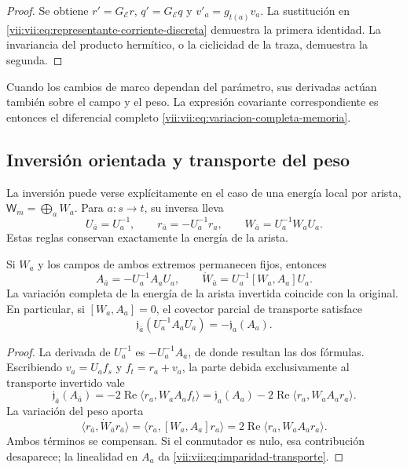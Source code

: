 \begin{proof}
Se obtiene \(r'=G_{\mathcal E}r\), \(q'=G_{\mathcal E}q\) y
\(v'_a=g_{t(a)}v_a\). La sustitución en
\eqref{vii:vii:eq:representante-corriente-discreta} demuestra la primera
identidad. La invariancia del producto hermítico, o la ciclicidad de
la traza, demuestra la segunda.
\end{proof}

Cuando los cambios de marco dependan del parámetro, sus derivadas
actúan también sobre el campo y el peso. La expresión covariante
correspondiente es entonces el diferencial completo
\eqref{vii:vii:eq:variacion-completa-memoria}.

\subsection{Inversión orientada y transporte del peso}
\label{vii:vii:subsec:inversion-respuesta}

La inversión puede verse explícitamente en el caso de una energía
local por arista, \(\mathsf W_m=\bigoplus_a W_a\).
Para \(a:s\to t\), su inversa lleva
\[
 U_{\bar a}=U_a^{-1},\qquad
 r_{\bar a}=-U_a^{-1}r_a,\qquad
 W_{\bar a}=U_a^{-1}W_aU_a.
\]
Estas reglas conservan exactamente la energía de la arista.

\begin{proposition}
\label{vii:vii:prop:inversion-respuesta}
Si \(W_a\) y los campos de ambos extremos permanecen fijos, entonces
\[
 A_{\bar a}=-U_a^{-1}A_aU_a,\qquad
 \dot W_{\bar a}=U_a^{-1}[W_a,A_a]U_a.
\]
La variación completa de la energía de la arista invertida coincide con
la original. En particular, si \([W_a,A_a]=0\), el covector parcial
de transporte satisface
\begin{equation}
 \mathfrak j_{\bar a}(U_a^{-1}A_aU_a)
 =-\mathfrak j_a(A_a).
 \label{vii:vii:eq:imparidad-transporte}
\end{equation}
\end{proposition}

\begin{proof}
La derivada de \(U_a^{-1}\) es \(-U_a^{-1}A_a\), de donde resultan
las dos fórmulas. Escribiendo \(v_a=U_af_s\) y \(f_t=r_a+v_a\),
la parte debida exclusivamente al transporte invertido vale
\[
 \mathfrak j_{\bar a}(A_{\bar a})
 =-2\operatorname{Re}\langle r_a,W_aA_af_t\rangle
 =\mathfrak j_a(A_a)
   -2\operatorname{Re}\langle r_a,W_aA_ar_a\rangle.
\]
La variación del peso aporta
\[
 \langle r_{\bar a},\dot W_{\bar a}r_{\bar a}\rangle
 =\langle r_a,[W_a,A_a]r_a\rangle
 =2\operatorname{Re}\langle r_a,W_aA_ar_a\rangle.
\]
Ambos términos se compensan. Si el conmutador es nulo, esa contribución
desaparece; la linealidad en \(A_a\) da
\eqref{vii:vii:eq:imparidad-transporte}.
\end{proof}

